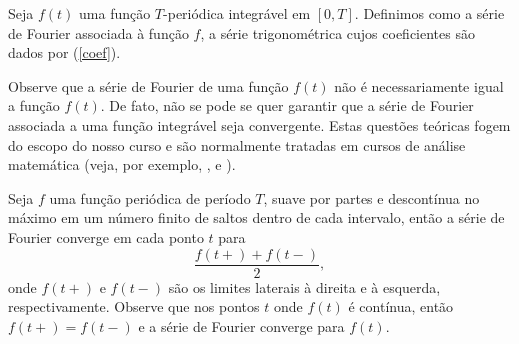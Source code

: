  \begin{defn} Seja $f(t)$ uma função $T$-periódica integrável em $[0,T]$. Definimos como a série de Fourier associada à função $f$, a série trigonométrica cujos coeficientes são dados por (\ref{coef}).
 \end{defn}
Observe que a série de Fourier de uma função $f(t)$ não é necessariamente igual a função $f(t)$. De fato, não se pode se quer garantir que a série de Fourier associada a uma função integrável seja convergente. Estas questões teóricas fogem do escopo do nosso curso e são normalmente tratadas em cursos de análise matemática (veja, por exemplo, \cite{DAVIS}, \cite{TOLSTOV} e \cite{HSU}).
\begin{teo}{\label{teo_Dirichlet}} Seja $f$ uma função periódica de período $T$, suave por partes e descontínua no máximo em um número finito de saltos dentro de cada intervalo, então a série de Fourier converge em cada ponto $t$ para
\begin{equation}
\frac{f(t+)+f(t-)}{2},
\end{equation}
onde $f(t+)$ e $f(t-)$ são os limites laterais à direita e à esquerda, respectivamente. Observe que nos pontos $t$ onde $f(t)$ é contínua, então $f(t+)=f(t-)$ e a série de Fourier converge para $f(t)$.
\end{teo}
